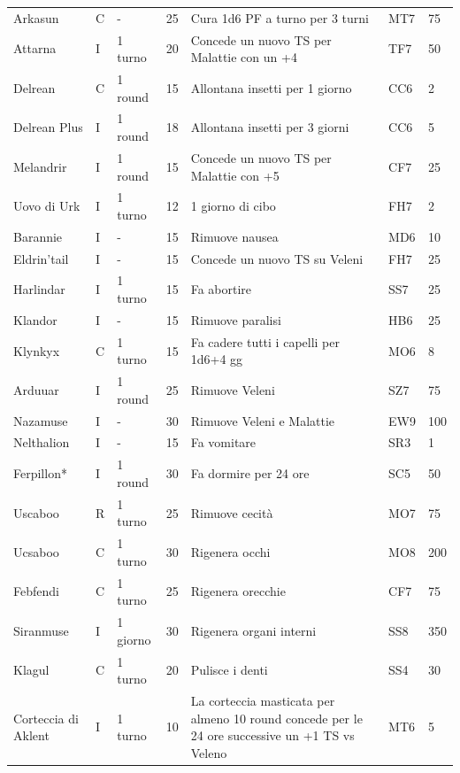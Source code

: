 \documentclass[a4paper,11pt,twoside,openany]{book}
\begin{document}
{\begin{longtable}{|L{3.2cm} |k{0.7cm} |k{1.7cm}| D{1cm} |L{5cm} |k{1.5cm} |k{1cm}|}
Arkasun & C & - & 25 & Cura 1d6 PF a turno per 3 turni & MT7 & 75\\
Attarna & I & 1 turno & 20 & Concede un nuovo TS per Malattie con un +4& TF7 & 50\\
Delrean & C & 1 round & 15 & Allontana insetti per 1 giorno & CC6 & 2\\
Delrean Plus & I & 1 round & 18 & Allontana insetti per 3 giorni & CC6 & 5\\
Melandrir & I & 1 round & 15 & Concede un nuovo TS per Malattie con +5 & CF7 & 25\\
Uovo di Urk & I & 1 turno & 12 & 1 giorno di cibo & FH7 & 2\\
Barannie & I & - & 15 & Rimuove nausea & MD6 & 10\\
Eldrin'tail & I & - & 15 & Concede un nuovo TS su Veleni & FH7 & 25\\
Harlindar & I & 1 turno & 15 & Fa abortire & SS7 & 25\\
Klandor & I & - & 15 & Rimuove paralisi & HB6 & 25\\
Klynkyx & C & 1 turno & 15 & Fa cadere tutti i capelli per 1d6+4 gg & MO6 & 8\\
Arduuar & I & 1 round & 25 & Rimuove Veleni & SZ7 & 75\\
Nazamuse & I & - & 30 & Rimuove Veleni e Malattie & EW9 & 100\\
Nelthalion & I & - & 15 & Fa vomitare & SR3 & 1\\
Ferpillon{*} & I & 1 round & 30 & Fa dormire per 24 ore & SC5 & 50\\
Uscaboo & R & 1 turno & 25 & Rimuove cecità & MO7 & 75\\
Ucsaboo  & C & 1 turno & 30 & Rigenera occhi & MO8 & 200\\
Febfendi  & C & 1 turno & 25 & Rigenera orecchie & CF7 & 75\\
Siranmuse & I & 1 giorno & 30 & Rigenera organi interni & SS8 & 350\\
Klagul & C & 1 turno & 20 & Pulisce i denti& SS4 & 30\\
Corteccia di Aklent & I & 1 turno & 10 & La corteccia masticata per almeno 10 round concede per le 24 ore successive un +1 TS vs Veleno& MT6 & 5\\

\end{longtable}}
\end{document}
